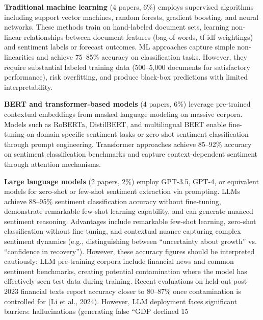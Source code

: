 \documentclass[11pt]{article}
\begin{document}
\textbf{Traditional machine learning} (4 papers, 6\%) employs supervised algorithms including support vector machines, random forests, gradient boosting, and neural networks. These methods train on hand-labeled document sets, learning non-linear relationships between document features (bag-of-words, tf-idf weightings) and sentiment labels or forecast outcomes. ML approaches capture simple non-linearities and achieve 75--85\% accuracy on classification tasks. However, they require substantial labeled training data (500--5,000 documents for satisfactory performance), risk overfitting, and produce black-box predictions with limited interpretability.

\textbf{BERT and transformer-based models} (4 papers, 6\%) leverage pre-trained contextual embeddings from masked language modeling on massive corpora. Models such as RoBERTa, DistilBERT, and multilingual BERT enable fine-tuning on domain-specific sentiment tasks or zero-shot sentiment classification through prompt engineering. Transformer approaches achieve 85--92\% accuracy on sentiment classification benchmarks and capture context-dependent sentiment through attention mechanisms.

\textbf{Large language models} (2 papers, 2\%) employ GPT-3.5, GPT-4, or equivalent models for zero-shot or few-shot sentiment extraction via prompting. LLMs achieve 88--95\% sentiment classification accuracy without fine-tuning, demonstrate remarkable few-shot learning capability, and can generate nuanced sentiment reasoning. Advantages include remarkable few-shot learning, zero-shot classification without fine-tuning, and contextual nuance capturing complex sentiment dynamics (e.g., distinguishing between ``uncertainty about growth'' vs. ``confidence in recovery''). However, these accuracy figures should be interpreted cautiously: LLM pre-training corpora include financial news and common sentiment benchmarks, creating potential contamination where the model has effectively seen test data during training. Recent evaluations on held-out post-2023 financial texts report accuracy closer to 80--87\% once contamination is controlled for (Li et al., 2024). However, LLM deployment faces significant barriers: hallucinations (generating false ``GDP declined 15%
\end{document}
